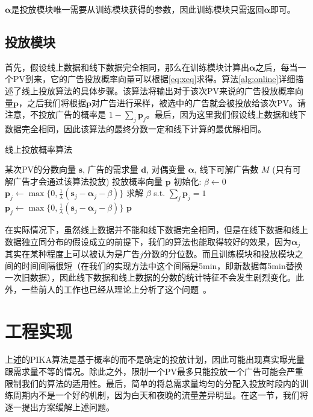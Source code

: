 $\bm{\alpha}$是投放模块唯一需要从训练模块获得的参数，因此训练模块只需返回$\bm{\alpha}$即可。

\subsection{投放模块}

首先，假设线上数据和线下数据完全相同，那么在训练模块计算出$\bm{\alpha}$之后，每当一个PV到来，它的广告投放概率向量可以根据\eqref{eq:xeq}求得。算法\ref{alg:online}详细描述了线上投放算法的具体步骤。该算法将输出对于该次PV来说的广告投放概率向量$\bm{p}$，之后我们将根据$\bm{p}$对广告进行采样，被选中的广告就会被投放给该次PV。请注意，不投放广告的概率是 $1-\sum_j \bm{p}_j$。最后，因为这里我们假设线上数据和线下数据完全相同，因此该算法的最终分数一定和线下计算的最优解相同。

\begin{algorithm}[htb]
	\caption{线上投放概率算法} 
	\label{alg:online}
	\begin{algorithmic}[1]
		\REQUIRE 某次PV的分数向量 $\bm{s}$, 广告的需求量 $\bm{d}$, 对偶变量 $\bm{\alpha}$, 线下可解广告数 $M$  (只有可解广告才会通过该算法投放)
		\ENSURE 投放概率向量 $\bm{p}$
		\STATE 初始化: $\beta \leftarrow 0$
		\STATE $\bm{p}_j \leftarrow \max \{0, \frac{1}{\lambda}  (\bm{s}_j - \bm{\alpha}_j - \beta )\}$
		\ENDFOR
		\STATE 求解 $\beta$ s.t. $\sum_j \bm{p}_j = 1$
		\STATE $\bm{p}_j \leftarrow \max \{0, \frac{1}{\lambda}  (\bm{s}_j - \bm{\alpha}_j - \beta )\}$
		\ENDFOR
		\ENDIF
		\RETURN $\bm{p}$
	\end{algorithmic}
\end{algorithm}

在实际情况下，虽然线上数据并不能和线下数据完全相同，但是在线下数据和线上数据独立同分布的假设成立的前提下，我们的算法也能取得较好的效果，因为$\bm{\alpha}_j$其实在某种程度上可以被认为是广告$j$分数的分位数。而且训练模块和投放模块之间的时间间隔很短（在我们的实现方法中这个间隔是5min，即新数据每5min替换一次旧数据），因此线下数据和线上数据的分数的统计特征不会发生剧烈变化。此外，一些前人的工作也已经从理论上分析了这个问题~\cite{devanur2009adwords, feldman2010online}。

\section{工程实现}

上述的PIKA算法是基于概率的而不是确定的投放计划，因此可能出现真实曝光量跟需求量不等的情况。除此之外，限制一个PV最多只能投放一个广告可能会严重限制我们的算法的适用性。最后，简单的将总需求量均匀的分配入投放时段内的训练周期内不是一个好的机制，因为白天和夜晚的流量差异明显。在这一节，我们将逐一提出方案缓解上述问题。

